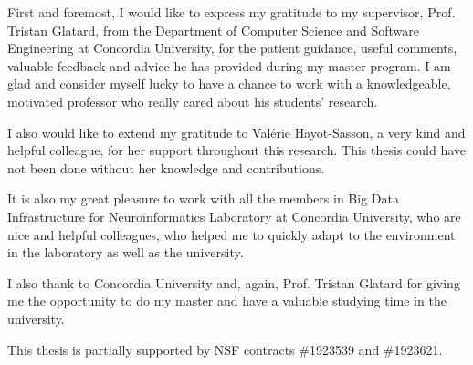 \begin{acknowledgments}

First and foremost, I would like to express my gratitude to my supervisor, 
Prof. Tristan Glatard, from the Department of Computer Science and 
Software Engineering at Concordia University, for the patient guidance, 
useful comments, valuable feedback and advice he has provided 
during my master program. 
I am glad and consider myself lucky to have a chance to work 
with a knowledgeable, motivated professor who really cared about 
his students' research. 

I also would like to extend my gratitude to Val\'erie Hayot-Sasson, 
a very kind and helpful colleague, for her support throughout this research. 
This thesis could have not been done without her knowledge and contributions. 

It is also my great pleasure to work with all the members in Big Data 
Infrastructure for Neuroinformatics Laboratory at Concordia University, 
who are nice and helpful colleagues, who helped me to quickly adapt to 
the environment in the laboratory as well as the university. 

I also thank to Concordia University and, again, Prof. Tristan Glatard for 
giving me the opportunity to do my master and have a valuable 
studying time in the university.

This thesis is partially supported by NSF contracts \#1923539 and \#1923621.

\end{acknowledgments}